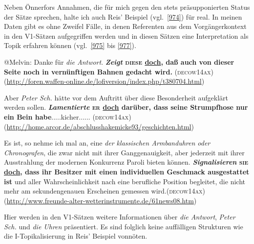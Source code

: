 {Neben Önnerfors Annahmen, die für mich gegen den stets präsupponierten Status der Sätze sprechen, halte ich auch Reis' Beispiel (vgl.\ \ref{974}) für real. In meinen Daten gibt es ohne Zweifel Fälle, in denen Referenten aus dem Vorgänger\-kontext in den V1-Sätzen aufgegriffen werden und in diesen Sätzen eine Interpretation als Topik erfahren können (vgl.\ \ref{975} bis \ref{977}).

\begin{exe}
	\ex\label{975}

	@Melvin: Danke für \emph{die Antwort}. \textbf{\textit{Zeigt} \textsc{diese} \ul{doch}, daß auch von dieser Seite noch in vernünftigen Bahnen 		gedacht wird.}	
	\hfill\hbox{\scshape(decow14ax)}
	\newline
	{\scriptsize(\url{http://foren.waffen-online.de/lofiversion/index.php/t380704.html})}
\end{exe}
			 
\begin{exe}
	\ex\label{976}

	Aber \emph{Peter Sch.} hätte vor dem Auftritt über diese Besonderheit aufgeklärt werden sollen. \textbf{\textit{Lamentierte} \textsc{er} 					\ul{doch} darüber, dass seine Strumpfhose nur ein Bein habe}.....kicher......	
	\hfill\hbox{\scshape(decow14ax)}
	\newline
	{\scriptsize(\url{http://home.arcor.de/abschlusshakemicke93/geschichten.html})}
\end{exe}						       
\largerpage[2]
\begin{exe}	
	\ex\label{977}

	Es ist, so nehme ich mal an, eine \emph{der klassischen Armbanduhren oder Chronografen}, die zwar nicht mit ihrer Ganggenauigkeit, aber jederzeit mit 		ihrer Ausstrahlung der modernen Konkurrenz Paroli bieten können. \textbf{\textit{Signalisieren} \textsc{sie} \ul{doch}, dass ihr Besitzer mit 		einen individuellen Geschmack ausgestattet ist} und aller Wahrscheinlichkeit nach eine berufliche Position begleitet, die nicht mehr am sekundengenauen 	Erscheinen gemessen wird.\newline\hbox{}\hfill\hbox{\scshape(decow14ax)}
	\newline
	{\scriptsize(\url{http://www.freunde-alter-wetterinstrumente.de/61news08.htm})}
\end{exe}						            						
Hier werden in den V1-Sätzen weitere Informationen über \textit{die Antwort}, \textit{Peter Sch.} und \textit{die Uhren} präsentiert. Es sind folglich keine auffälligen Strukturen wie die I-Topikalisierung  in Reis' Beispiel vonnöten. 

}
